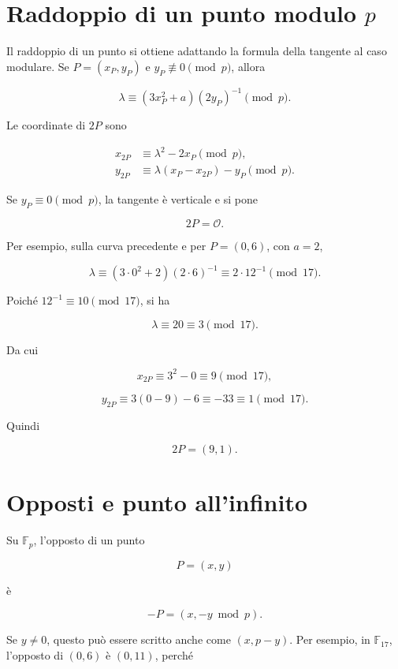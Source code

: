 \documentclass[12pt,a4paper,oneside]{report}
\begin{document}
\section{Raddoppio di un punto modulo \texorpdfstring{\(p\)}{p}}

Il raddoppio di un punto si ottiene adattando la formula della tangente al caso modulare. Se \(P=(x_P,y_P)\) e \(y_P\not\equiv 0\pmod p\), allora

\begin{equation}
    \lambda \equiv (3x_P^2+a)(2y_P)^{-1}\pmod p.
    \label{eq:lambda-double-fp}
\end{equation}

Le coordinate di \(2P\) sono

\begin{align}
    x_{2P} &\equiv \lambda^2-2x_P \pmod p, \label{eq:double-x-fp}\\
    y_{2P} &\equiv \lambda(x_P-x_{2P})-y_P \pmod p. \label{eq:double-y-fp}
\end{align}

Se \(y_P\equiv 0\pmod p\), la tangente è verticale e si pone

\[
2P=\mathcal{O}.
\]

Per esempio, sulla curva precedente e per \(P=(0,6)\), con \(a=2\),

\[
\lambda \equiv (3\cdot 0^2+2)(2\cdot 6)^{-1}\equiv 2\cdot 12^{-1}\pmod{17}.
\]

Poiché \(12^{-1}\equiv 10\pmod{17}\), si ha

\[
\lambda\equiv 20\equiv 3\pmod{17}.
\]

Da cui

\[
x_{2P}\equiv 3^2-0\equiv 9\pmod{17},
\]

\[
y_{2P}\equiv 3(0-9)-6\equiv -33\equiv 1\pmod{17}.
\]

Quindi

\[
2P=(9,1).
\]

\section{Opposti e punto all'infinito}

Su \(\mathbb{F}_p\), l'opposto di un punto

\[
P=(x,y)
\]

è

\begin{equation}
    -P=(x,-y\bmod p).
\end{equation}

Se \(y\neq 0\), questo può essere scritto anche come \((x,p-y)\). Per esempio, in \(\mathbb{F}_{17}\), l'opposto di \((0,6)\) è \((0,11)\), perché
\end{document}
